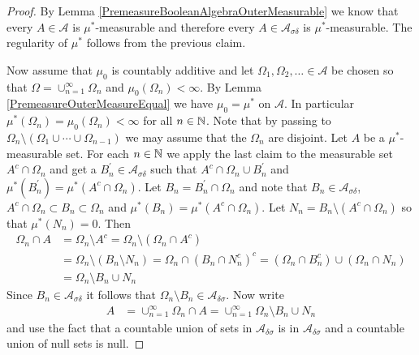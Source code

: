 \begin{proof}
By Lemma \ref{PremeasureBooleanAlgebraOuterMeasurable} we know that every $A \in \mathcal{A}$ is $\mu^*$-measurable and therefore every $A \in \mathcal{A}_{\sigma \delta}$ is $\mu^*$-measurable.  The regularity of $\mu^*$ follows from the previous claim.

Now assume that $\mu_0$ is countably additive and let $\Omega_1, \Omega_2, \dotsc \in \mathcal{A}$ be chosen so that $\Omega = \cup_{n=1}^\infty \Omega_n$ and $\mu_0(\Omega_n) < \infty$.  By Lemma \ref{PremeasureOuterMeasureEqual} we have $\mu_0 = \mu^*$ on $\mathcal{A}$.  In particular $\mu^*(\Omega_n) = \mu_0(\Omega_n)< \infty$ for all $n \in \mathbb{N}$.
Note that by passing to $\Omega_n \setminus (\Omega_1 \cup \dotsb \cup \Omega_{n-1})$ we may assume that the $\Omega_n$ are disjoint.  Let $A$ be a $\mu^*$-measurable set.  For each $n \in \mathbb{N}$ we apply the last claim to the measurable set $A^c \cap \Omega_n$ and get a $B^\prime_n \in \mathcal{A}_{\sigma \delta}$ such that $A^c \cap \Omega_n \cup B^\prime_n$ and 
$\mu^*(B^\prime_n) = \mu^*(A^c \cap \Omega_n)$.  Let $B_n = B^\prime_n \cap \Omega_n$ and note that $B_n \in \mathcal{A}_{\sigma \delta}$, $A^c \cap \Omega_n \subset B_n \subset \Omega_n$
and $\mu^*(B_n) = \mu^*(A^c \cap \Omega_n)$.  Let $N_n = B_n \setminus (A^c \cap \Omega_n)$ so that $\mu^*(N_n) = 0$.  Then
\begin{align*}
\Omega_n \cap A &= \Omega_n \setminus A^c = \Omega_n \setminus \left(\Omega_n \cap A^c \right) \\
&=\Omega_n \setminus \left( B_n \setminus N_n \right) = \Omega_n \cap \left( B_n \cap N_n^c \right)^c = \left(\Omega_n \cap B_n^c  \right) \cup \left( \Omega_n \cap N_n \right) \\
&= \Omega_n \setminus B_n \cup N_n
\end{align*}
Since $B_n \in \mathcal{A}_{\sigma \delta}$ it follows that $\Omega_n \setminus B_n \in \mathcal{A}_{\delta \sigma}$.  Now write
\begin{align*}
A &= \cup_{n=1}^\infty \Omega_n \cap A  = \cup_{n=1}^\infty \Omega_n \setminus B_n \cup N_n
\end{align*}
and use the fact that a countable union of sets in $\mathcal{A}_{\delta \sigma}$ is in $\mathcal{A}_{\delta \sigma}$ and a countable union of null sets is null.
\end{proof}

